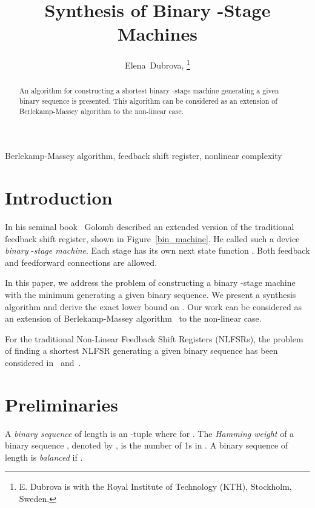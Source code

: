 \documentclass[twocolumn]{IEEEtran} \usepackage{epsfig}
\begin{document}
\title{Synthesis of Binary -Stage Machines} 
\author{Elena~Dubrova, \thanks{E. Dubrova is with the Royal Institute of Technology (KTH), Stockholm, Sweden.}}

\maketitle

\begin{abstract}
An algorithm for constructing a shortest binary -stage machine 
generating a given binary sequence is presented. This algorithm 
can be considered as an extension of Berlekamp-Massey algorithm to the non-linear case. 
\end{abstract}


\begin{keywords}
Berlekamp-Massey algorithm, feedback shift register, nonlinear complexity
\end{keywords}

\section{Introduction}

In his seminal book~\cite{Golomb_book} Golomb described an extended version of the traditional
feedback shift register, shown in Figure~\ref{bin_machine}. He called such a device {\em binary}
-{\em stage machine}. Each stage  has its own next state function .
Both feedback and feedforward connections are allowed.  

In this paper, we address the problem of constructing a binary
-stage machine with the minimum  generating a given
binary sequence. We present a synthesis algorithm and derive the exact lower bound on
. Our work can be considered as an extension of Berlekamp-Massey
algorithm~\cite{Ma69} to the non-linear case. 


For the traditional Non-Linear Feedback Shift Registers (NLFSRs), 
the problem of finding a shortest NLFSR generating a
given binary sequence has been considered in~\cite{Ja91,RiK05,RiKK05}
and~\cite{LiKK07}.  

\section{Preliminaries} 

A {\em binary sequence}  of length  is an -tuple 
where  for . The {\em Hamming weight} of a binary sequence ,
denoted by  ,  is the number of 1s in . A binary sequence  of length  is  {\em balanced}
if .
\end{document}
